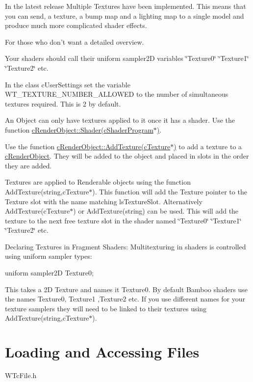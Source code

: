 In the latest release Multiple Textures have been implemented. This means that you can send, a texture, a bump map and a lighting map to a single model and produce much more complicated shader effects. \par
 For those who don't want a detailed overview.
\begin{DoxyItemize}
\item Your shaders should call their uniform sampler2D variables \char`\"{}Texture0\char`\"{} \char`\"{}Texture1\char`\"{} \char`\"{}Texture2\char`\"{} etc.
\item In the class cUserSettings set the variable WT\_\-TEXTURE\_\-NUMBER\_\-ALLOWED to the number of simultaneous textures required. This is 2 by default.
\item An Object can only have textures applied to it once it has a shader. Use the function \hyperlink{classc_render_object_abd47a58de22adfe1e9a1970f66a2f4cd}{cRenderObject::Shader(cShaderProgram$\ast$)}.
\item Use the function \hyperlink{classc_render_object_ad45b379f57731d803f7a52e58d91d3aa}{cRenderObject::AddTexture(cTexture$\ast$)} to add a texture to a \hyperlink{classc_render_object}{cRenderObject}. They will be added to the object and placed in slots in the order they are added. \par
 Textures are applied to Renderable objects using the function AddTexture(string,cTexture$\ast$). This function will add the Texture pointer to the Texture slot with the name matching lsTextureSlot. Alternatively AddTexture(cTexture$\ast$) or AddTexture(string) can be used. This will add the texture to the next free texture slot in the shader named \char`\"{}Texture0\char`\"{} \char`\"{}Texture1\char`\"{} \char`\"{}Texture2\char`\"{} etc. \par
 Declaring Textures in Fragment Shaders: Multitexturing in shaders is controlled using uniform sampler types: 
\begin{DoxyCode}
 uniform sampler2D Texture0;
\end{DoxyCode}
 This takes a 2D Texture and names it Texture0. By default Bamboo shaders use the names Texture0, Texture1 ,Texture2 etc. If you use different names for your texture samplers they will need to be linked to their textures using AddTexture(string,cTexture$\ast$). \par

\end{DoxyItemize}\hypertarget{_using_engine_page_FilesAccessPage}{}\section{Loading and Accessing Files}\label{_using_engine_page_FilesAccessPage}
WTcFile.h

